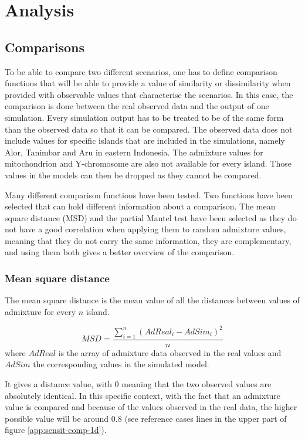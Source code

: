 \documentclass[a4paper,12pt]{report}
\begin{document}
\section{Analysis}
\label{section:analysis}
\subsection{Comparisons}
\label{subsection:comparisons}
To be able to compare two different scenarios, one has to define comparison functions that will be able to provide a value of similarity or dissimilarity when provided with observable values that characterise the scenarios. In this case, the comparison is done between the real observed data and the output of one simulation.
Every simulation output has to be treated to be of the same form than the observed data so that it can be compared. The observed data does not include values for specific islands that are included in the simulations, namely Alor, Tanimbar and Aru in eastern Indonesia. The admixture values for mitochondrion and Y-chromosome are also not available for every island.
Those values in the models can then be dropped as they cannot be compared.

Many different comparison functions have been tested. Two functions have been selected that can hold different information about a comparison. The mean square distance (MSD) and the partial Mantel test have been selected as they do not have a good correlation when applying them to random admixture values, meaning that they do not carry the same information, they are complementary, and using them both gives a better overview of the comparison.

\subsubsection{Mean square distance}
The mean square distance is the mean value of all the distances between values of admixture for every $n$ island.

\begin{equation}
MSD = \frac{\sum\limits_{i=1}^{n} (AdReal_i - AdSim_i) ^ 2}{n}
\end{equation}
where $AdReal$ is the array of admixture data observed in the real values and $AdSim$ the corresponding values in the simulated model.

It gives a distance value, with 0 meaning that the two observed values are absolutely identical. In this specific context, with the fact that an admixture value is compared and because of the values observed in the real data, the higher possible value will be around $0.8$ (see reference cases lines in the upper part of figure \ref{app:sensit-comp-1d}).
\end{document}
